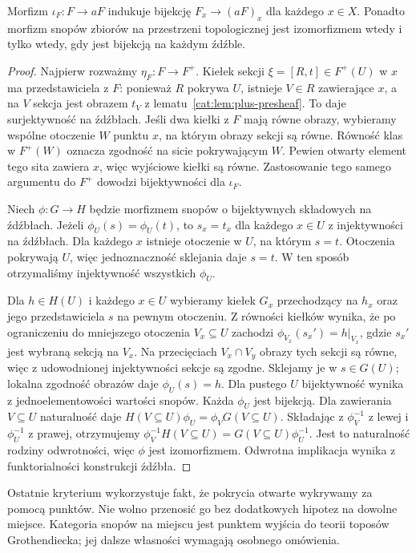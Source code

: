\begin{twierdzenie}\label{cat:thm:sheafification-stalks}
Morfizm $\iota_F:F\to aF$ indukuje bijekcję $F_x\to(aF)_x$ dla każdego $x\in X$. Ponadto morfizm snopów zbiorów na przestrzeni topologicznej jest izomorfizmem wtedy i tylko wtedy, gdy jest bijekcją na każdym źdźble.
\end{twierdzenie}
\begin{proof}
Najpierw rozważmy $\eta_F:F\to F^+$. Kiełek sekcji $\xi=[R,t]\in F^+(U)$ w $x$ ma przedstawiciela z $F$: ponieważ $R$ pokrywa $U$, istnieje $V\in R$ zawierające $x$, a na $V$ sekcja jest obrazem $t_V$ z lematu~\ref{cat:lem:plus-presheaf}. To daje surjektywność na źdźbłach. Jeśli dwa kiełki z $F$ mają równe obrazy, wybieramy wspólne otoczenie $W$ punktu $x$, na którym obrazy sekcji są równe. Równość klas w $F^+(W)$ oznacza zgodność na sicie pokrywającym $W$. Pewien otwarty element tego sita zawiera $x$, więc wyjściowe kiełki są równe. Zastosowanie tego samego argumentu do $F^+$ dowodzi bijektywności dla $\iota_F$.

Niech $\phi:G\to H$ będzie morfizmem snopów o bijektywnych składowych na źdźbłach. Jeżeli $\phi_U(s)=\phi_U(t)$, to $s_x=t_x$ dla każdego $x\in U$ z injektywności na źdźbłach. Dla każdego $x$ istnieje otoczenie w $U$, na którym $s=t$. Otoczenia pokrywają $U$, więc jednoznaczność sklejania daje $s=t$. W ten sposób otrzymaliśmy injektywność wszystkich $\phi_U$.

Dla $h\in H(U)$ i każdego $x\in U$ wybieramy kiełek $G_x$ przechodzący na $h_x$ oraz jego przedstawiciela $s$ na pewnym otoczeniu. Z równości kiełków wynika, że po ograniczeniu do mniejszego otoczenia $V_x\subseteq U$ zachodzi $\phi_{V_x}(s_x')=h|_{V_x}$, gdzie $s_x'$ jest wybraną sekcją na $V_x$. Na przecięciach $V_x\cap V_y$ obrazy tych sekcji są równe, więc z udowodnionej injektywności sekcje są zgodne. Sklejamy je w $s\in G(U)$; lokalna zgodność obrazów daje $\phi_U(s)=h$. Dla pustego $U$ bijektywność wynika z jednoelementowości wartości snopów. Każda $\phi_U$ jest bijekcją. Dla zawierania $V\subseteq U$ naturalność daje $H(V\subseteq U)\phi_U=\phi_VG(V\subseteq U)$. Składając z $\phi_V^{-1}$ z lewej i $\phi_U^{-1}$ z prawej, otrzymujemy $\phi_V^{-1}H(V\subseteq U)=G(V\subseteq U)\phi_U^{-1}$. Jest to naturalność rodziny odwrotności, więc $\phi$ jest izomorfizmem. Odwrotna implikacja wynika z funktorialności konstrukcji źdźbła.
\end{proof}

\begin{uwaga}
Ostatnie kryterium wykorzystuje fakt, że pokrycia otwarte wykrywamy za pomocą punktów. Nie wolno przenosić go bez dodatkowych hipotez na dowolne miejsce. Kategoria snopów na miejscu jest punktem wyjścia do teorii toposów Grothendiecka; jej dalsze własności wymagają osobnego omówienia.
\end{uwaga}
